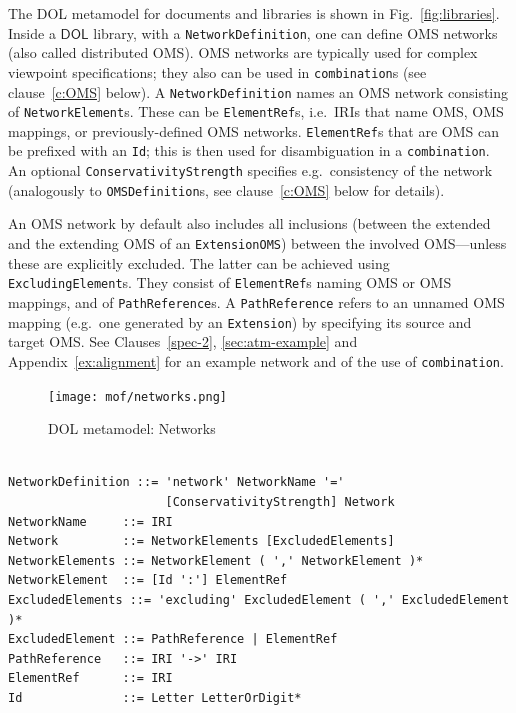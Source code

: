 \documentclass[10pt, a4paper]{isov2}
\newcommand*{\syntax}[1]{\texttt{#1}}
\newcommand*{\DOL}{\ensuremath{\mathsf{DOL}}\xspace}
\begin{document}
\label{c:networks}


The DOL metamodel for documents and libraries is shown in Fig.~\ref{fig:libraries}.
Inside a \DOL library, with a \syntax{NetworkDefinition}, one can
define OMS networks (also called distributed OMS). OMS networks are
typically used for complex viewpoint specifications; they also can be
used in \syntax{combination}s (see clause~\ref{c:OMS} below). A
\syntax{NetworkDefinition} names an OMS network consisting of
\syntax{NetworkElement}s. These can be \syntax{ElementRef}s,
i.e.\ IRIs that name OMS, OMS mappings, or previously-defined OMS
networks. \syntax{ElementRef}s that are OMS can be prefixed with an
\syntax{Id}; this is then used for disambiguation in a
\syntax{combination}.  An optional \syntax{ConservativityStrength}
specifies e.g.\ consistency of the network (analogously to
\syntax{OMSDefinition}s, see clause~\ref{c:OMS} below for details).


An OMS network by default also includes all inclusions (between
the extended and the extending OMS of an \syntax{ExtensionOMS})
between the involved OMS---unless these are explicitly excluded.
The latter can be achieved using \syntax{ExcludingElement}s.
They consist of \syntax{ElementRef}s naming OMS or OMS mappings,
and of \syntax{PathReference}s. A \syntax{PathReference} refers
to an unnamed OMS mapping (e.g.\ one generated by an \syntax{Extension}) 
by specifying its source and target OMS. See Clauses~\ref{spec-2}, \ref{sec:atm-example}
and Appendix~\ref{ex:alignment} for an example network and of the use of \syntax{combination}.

\medskip
\begin{figure}
  \centering
    \texttt{[image: mof/networks.png]}
  \caption{DOL metamodel: Networks}
  \label{fig:networks}
\end{figure}




\vspace{-1.4em}
\begin{lstlisting}[language=ebnf,escapeinside={()},morecomment={[l]{\%\%\ }}]

NetworkDefinition ::= 'network' NetworkName '='
                      [ConservativityStrength] Network
NetworkName     ::= IRI
Network         ::= NetworkElements [ExcludedElements]
NetworkElements ::= NetworkElement ( ',' NetworkElement )*
NetworkElement  ::= [Id ':'] ElementRef
ExcludedElements ::= 'excluding' ExcludedElement ( ',' ExcludedElement )*
ExcludedElement ::= PathReference | ElementRef
PathReference   ::= IRI '->' IRI
ElementRef      ::= IRI
Id              ::= Letter LetterOrDigit*
\end{lstlisting}
\end{document}
